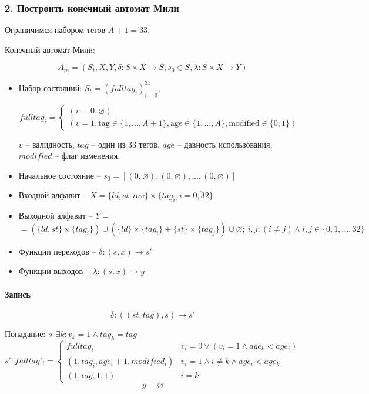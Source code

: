 
\subsubsection*{2. Построить конечный автомат Мили}

Ограничимся набором тегов $A + 1 = 33$.
\par\medskip

Конечный автомат Мили:

$$A_m = (S_t,X,Y,\delta:S\times X \rightarrow S, s_0 \in S, \lambda : S\times X \rightarrow Y)$$

\begin{itemize}[itemindent=0pt,leftmargin=0em,topsep=0pt,itemsep=-1ex,partopsep=1ex,parsep=1ex]
	\item Набор состояний: $S_t = (fulltag_i)^{31}_{i=0}$,

	\[
	fulltag_i =
	\begin{cases}
	  (v = 0, \varnothing) \\
	  (v = 1, \text{tag} \in \{1, \dots, A+1\}, \text{age} \in \{1, \dots, A\}, \text{modified} \in \{0,1\})
	\end{cases}
	\]

	$v$ -- валидность, $tag$ -- один из 33 тегов, $age$ -- давность использования, $modified$ -- флаг изменения.
	\par\medskip

	\item Начальное состояние -- $s_0 = [(0, \varnothing),(0, \varnothing),...,(0, \varnothing)]$
	\item Входной алфавит -- $X = \{ld,st,inv\}\times\{tag_i,i=\overline{0,32}\}$
	\item Выходной алфавит -- $Y = $ \\
	$ = \left(\{ld,st\}\times\{tag_i\}\right) \cup \left(\{ld\}\times\{tag_i\}+\{st\}\times\{tag_j\}\right)\cup\varnothing;~i,j: (i\neq j) \land i,j \in \{0, 1, \dots, 32\}$
	\item Функции переходов -- $\delta: (s,x)\rightarrow s'$
	\item Функции выходов -- $\lambda: (s,x) \rightarrow y$
\end{itemize}

\paragraph*{Запись}

$$\delta : ((st,tag),s) \rightarrow s'$$

Попадание: $s: \exists k : v_k = 1 \land tag_k = tag$
\[
s':fulltag'_i =
\begin{cases}
	fulltag_i & v_i = 0 \lor (v_i = 1 \land age_k < age_i)\\
	(1,tag_i,age_{i}+1,modified_i) & v_i = 1 \land i \neq k \land age_i < age_k \\
	(1,tag,1,1) & i = k
\end{cases}
\]
$$y = \varnothing$$

